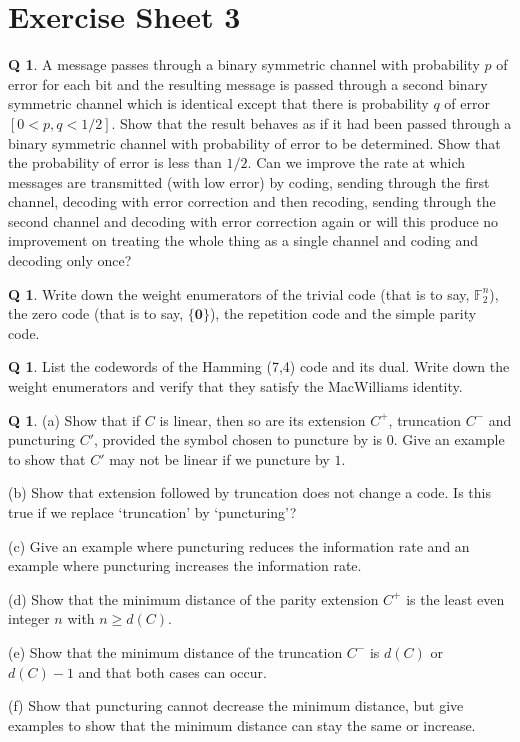 \documentclass[12pt,a4paper]{article}
\theoremstyle{plain}
\theoremstyle{definition}
\newtheorem{question}[theorem]{Q}
\begin{document}
    \section{Exercise Sheet 3}
    \begin{question}
        \label{C3.1}
        A message passes through a binary symmetric
        channel with probability $p$ of error for each bit
        and the resulting message is passed through a
        second binary symmetric
        channel which is identical except
        that there is probability $q$ of error $[0<p,q<1/2]$.
        Show that the result behaves as if it had been
        passed through
        a binary symmetric
        channel with probability of error to be determined.
        Show that the probability of error is less than $1/2$.
        Can we improve the rate at which messages are transmitted
        (with low error) by coding,
        sending through the first channel,
        decoding with error correction
        and then recoding, sending through the
        second channel and decoding
        with error correction again or will this produce
        no improvement on treating the whole thing as a single channel
        and coding and decoding only once?
    \end{question}
    \begin{question}
        \label{C3.2}
        Write down the weight enumerators
        of the trivial code (that is to say, ${\mathbb F}_{2}^{n}$), the zero code
        (that is to say, $\{{\boldsymbol 0}\}$),
        the repetition code and the simple
        parity code.
    \end{question}
    \begin{question}
        \label{C3.3}
        List the codewords of the Hamming (7,4)
        code and its dual. Write down the weight enumerators and verify
        that they satisfy the MacWilliams identity.
    \end{question}
    \begin{question}
        \label{C3.4} (a) Show that if $C$ is linear,
        then so are its extension $C^{+}$, truncation
        $C^{-}$ and puncturing $C'$, provided the symbol
        chosen to puncture by is 0. Give an example to show
        that $C'$ may not be linear if we puncture by $1$.


        (b) Show that extension followed by truncation does not change
        a code. Is this true if we replace `truncation' by `puncturing'?

        (c) Give an example where puncturing reduces the information
        rate and an example where puncturing increases the information
        rate.

        (d) Show that the minimum distance of
        the parity extension $C^{+}$ is the least even
        integer $n$ with $n\geq d(C)$.

        (e) Show that
        the minimum distance of the truncation $C^{-}$ is $d(C)$ or $d(C)-1$
        and that both cases can occur.

        (f) Show that puncturing cannot decrease the minimum distance,
        but give examples to show that the minimum distance can
        stay the same or increase.
    \end{question}
\end{document}
